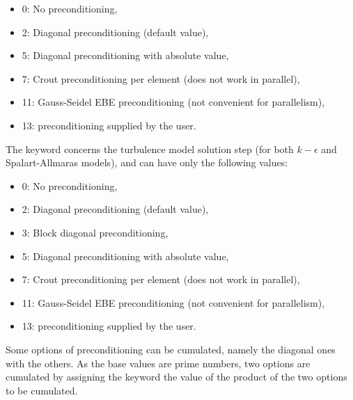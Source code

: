 \begin{itemize}
\item 0: No preconditioning,

\item 2: Diagonal preconditioning (default value),


\item 5: Diagonal preconditioning with absolute value,

\item 7: Crout preconditioning per element (does not work in parallel),

\item 11: Gauss-Seidel EBE preconditioning
(not convenient for parallelism),

\item 13: preconditioning supplied by the user.
\end{itemize}

The keyword  concerns
the turbulence model solution step (for both $k-\epsilon$ and Spalart-Allmaras
models), and can have only the following values:

\begin{itemize}
\item 0: No preconditioning,

\item 2: Diagonal preconditioning (default value),

\item 3: Block diagonal preconditioning,

\item 5: Diagonal preconditioning with absolute value,

\item 7: Crout preconditioning per element (does not work in parallel),

\item 11: Gauss-Seidel EBE preconditioning
(not convenient for parallelism),

\item 13: preconditioning supplied by the user.
\end{itemize}

Some options of preconditioning can be cumulated,
namely the diagonal ones with the others.
As the base values are prime numbers, two options are cumulated by assigning
the keyword the value of the product of the two options to be cumulated.

